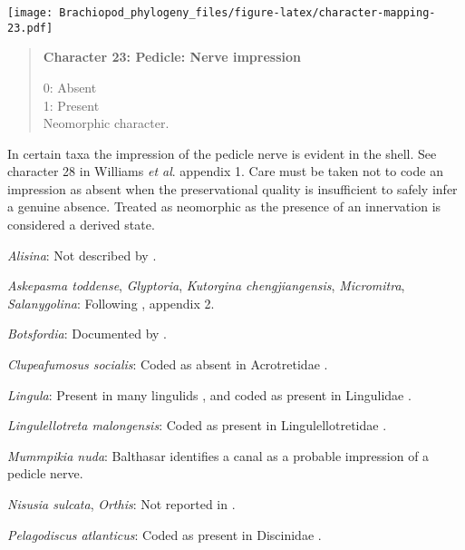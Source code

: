 \documentclass[openany]{book}
\theoremstyle{definition}
\theoremstyle{definition}
\theoremstyle{definition}
\theoremstyle{remark}
\begin{document}
\texttt{[image: Brachiopod\_phylogeny\_files/figure-latex/character-mapping-23.pdf]}

\begin{quote}
\textbf{Character 23: Pedicle: Nerve impression}

0: Absent\\
1: Present\\
Neomorphic character.
\end{quote}

In certain taxa the impression of the pedicle nerve is evident in the
shell. See character 28 in Williams \emph{et al}.
\citeyearpar{Williams1998Thediversity} appendix 1. Care must be taken
not to code an impression as absent when the preservational quality is
insufficient to safely infer a genuine absence. Treated as neomorphic as
the presence of an innervation is considered a derived state.

\hypertarget{Alisina-coding-23}{}
\emph{Alisina}: Not described by
\citet{Williams2000LinguliformeaCraniiformea}.

\hypertarget{Askepasma_toddense-coding-23}{}
\emph{Askepasma toddense}, \emph{Glyptoria}, \emph{Kutorgina
chengjiangensis}, \emph{Micromitra}, \emph{Salanygolina}: Following
\citet{Williams1998Thediversity}, appendix 2.

\hypertarget{Botsfordia-coding-23}{}
\emph{Botsfordia}: Documented by \citet{Skovsted2017Depthrelated}.

\hypertarget{Clupeafumosus_socialis-coding-23}{}
\emph{Clupeafumosus socialis}: Coded as absent in Acrotretidae
\citep[table 6]{Williams2000LinguliformeaCraniiformea}.

\hypertarget{Lingula-coding-23}{}
\emph{Lingula}: Present in many lingulids
\citep{Williams2000LinguliformeaCraniiformea}, and coded as present in
Lingulidae \citep[table 6]{Williams2000LinguliformeaCraniiformea}.

\hypertarget{Lingulellotreta_malongensis-coding-23}{}
\emph{Lingulellotreta malongensis}: Coded as present in
Lingulellotretidae \citep[table
6]{Williams2000LinguliformeaCraniiformea}.

\hypertarget{Mummpikia_nuda-coding-23}{}
\emph{Mummpikia nuda}: Balthasar
\citeyearpar[p.~274]{Balthasar2008iMummpikia} identifies a canal as a
probable impression of a pedicle nerve.

\hypertarget{Nisusia_sulcata-coding-23}{}
\emph{Nisusia sulcata}, \emph{Orthis}: Not reported in
\citet{Williams2000LinguliformeaCraniiformea}.

\hypertarget{Pelagodiscus_atlanticus-coding-23}{}
\emph{Pelagodiscus atlanticus}: Coded as present in Discinidae
\citep[table 6]{Williams2000LinguliformeaCraniiformea}.
\end{document}
